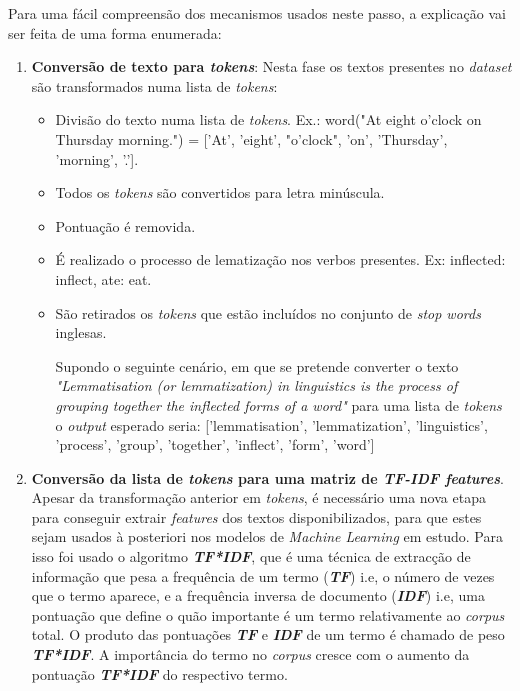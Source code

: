 Para uma fácil compreensão dos mecanismos usados neste passo, a explicação vai ser feita de uma forma enumerada:
\begin{enumerate}
\item \textbf{Conversão de texto para \textit{tokens}}: Nesta fase os textos presentes no \textit{dataset} são transformados numa lista de \textit{tokens}:
\begin{itemize}
\item Divisão do texto numa lista de \textit{tokens}. Ex.: word("At eight o'clock on Thursday morning.") = ['At', 'eight', "o'clock", 'on', 'Thursday', 'morning', '.'].
\item Todos os \textit{tokens} são convertidos para letra minúscula.
\item Pontuação é removida.
\item É realizado o processo de lematização nos verbos presentes. Ex: inflected: inflect, ate: eat.
\item São retirados os \textit{tokens} que estão incluídos no conjunto de \textit{stop words} inglesas.

\bigbreak
Supondo o seguinte cenário, em que se pretende converter o texto \textit{"Lemmatisation (or lemmatization) in linguistics is the process of grouping together the inflected forms of a word"} para uma lista de \textit{tokens} o \textit{output} esperado seria: ['lemmatisation', 'lemmatization', 'linguistics', 'process', 'group', 'together', 'inflect', 'form', 'word']
\end{itemize}

\bigbreak
\item \textbf{Conversão da lista de \textit{tokens} para uma matriz de \textit{TF-IDF features}}.
Apesar da transformação anterior em \textit{tokens}, é necessário uma nova etapa para conseguir extrair \textit{features} dos textos disponibilizados, para que estes sejam usados à posteriori nos modelos de \textit{Machine Learning} em estudo. Para isso foi usado o algoritmo \textit{\textbf{TF*IDF}}, que é uma técnica de extracção de informação que pesa a frequência de um termo (\textbf{\textit{TF}}) i.e, o número de vezes que o termo aparece, e a frequência inversa de documento (\textbf{\textit{IDF}}) i.e, uma pontuação que define o quão importante é um termo relativamente ao \textit{corpus} total. O produto das pontuações \textbf{\textit{TF}} e \textbf{\textit{IDF}} de um termo é chamado de peso \textbf{\textit{TF*IDF}}. A importância do termo no \textit{corpus} cresce com o aumento da pontuação \textbf{\textit{TF*IDF}} do respectivo termo.


\end{enumerate}
